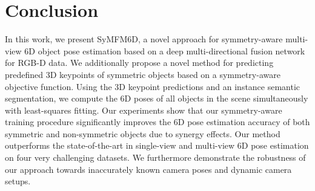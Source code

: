 \section{Conclusion}

In this work, we present SyMFM6D, a novel approach for symmetry-aware multi-view 6D object pose estimation based on a deep multi-directional fusion network for RGB-D data. We additionally propose a novel method for predicting predefined 3D keypoints of symmetric objects based on a symmetry-aware objective function. Using the 3D keypoint predictions and an instance semantic segmentation, we compute the 6D poses of all objects in the scene simultaneously with least-squares fitting. Our experiments show that our symmetry-aware training procedure significantly improves the 6D pose estimation accuracy of both symmetric and non-symmetric objects due to synergy effects. Our method outperforms the state-of-the-art in single-view and multi-view 6D pose estimation on four very challenging datasets. We furthermore demonstrate the robustness of our approach towards inaccurately known camera poses and dynamic camera setups.
